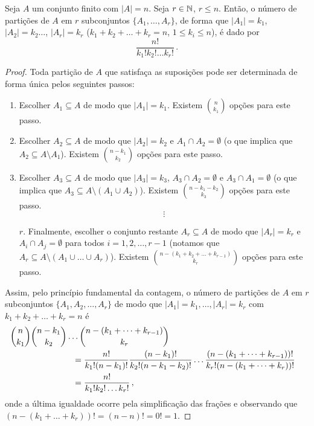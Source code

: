 \begin{proposition}
Seja $A$ um conjunto finito com $|A|=n$. Seja $r \in \mathbb{N}$, $r \leq n$. Então, o número de partições de $A$ em $r$ subconjuntos $\{A_1, \dots, A_r\}$, de forma que 
$|A_1|=k_1$, $|A_2|=k_2\dots$, $|A_r|=k_r$ ($k_1+k_2+\dots+k_r=n$, $1 \leq k_i \leq n$), é dado por
\begin{equation}
\frac{n!}{k_1!k_2!\dots k_r!} \,.
\end{equation}
\label{prop_no_part}
\end{proposition}
\begin{proof}
Toda partição de $A$ que satisfaça as suposições pode ser determinada de forma única pelos seguintes passos:
\begin{enumerate}[noitemsep]
\item Escolher $A_1 \subseteq A$ de modo que $|A_1|=k_1$. Existem ${n \choose k_1}$ opções para este passo.
\item Escolher $A_2 \subseteq A$ de modo que $|A_2|=k_2$ e $A_1 \cap A_2 = \emptyset$ (o que implica que $A_2 \subseteq A \setminus A_1$). Existem 
$ {n-k_1 \choose k_2}$ opções para este passo.
\item Escolher $A_3 \subseteq A$ de modo que $|A_3|=k_3$, $A_3 \cap A_2 = \emptyset$ e $A_3 \cap A_1 = \emptyset$ (o que implica que $A_3 \subseteq A \setminus (A_1 \cup A_2)$). Existem 
$ {n-k_1-k_2 \choose k_3}$ opções para este passo.
$$\vdots$$
\item[$r$.] Finalmente, escolher o conjunto restante $A_r \subseteq A$ de modo que $|A_r|=k_r$ e $A_i \cap A_j = \emptyset$ para todos $i=1,2,\dots,r-1$ (notamos que $A_r \subseteq A \setminus (A_1 \cup \dots \cup A_r)$). Existem 
$ {n-(k_1+k_2+\dots+k_{r-1}) \choose k_r}$ opções para este passo.
\end{enumerate}
Assim, pelo princípio fundamental da contagem, o número de partições de $A$ em $r$ subconjuntos $\{A_1,A_2,\dots,A_r\}$ de modo que $|A_1|=k_1,\dots,|A_r|=k_r$ com $k_1+k_2+\dots+k_r=n$ é
\begin{align}
& {n \choose k_1}{n-k_1 \choose k_2} \dots {n-(k_1+\dots+k_{r-1} ) \choose k_r}  \\
& \hspace{2.6cm}
= \frac{n!}{k_1!(n-k_1)!}\frac{(n-k_1)!}{k_2!(n-k_1-k_2)!} \dots \frac{(n-(k_1+\dots+k_{r-1}))!}{k_r!(n-(k_1+\dots+k_{r}))!} &\\
& \hspace{2.6cm} = \frac{n!}{k_1!k_2!\dots k_r!} \,,
\end{align}
onde a última igualdade ocorre pela simplificação das frações e observando que 
$(n-(k_1+\dots+k_{r}))!=(n-n)!=0!=1.$
\end{proof}

